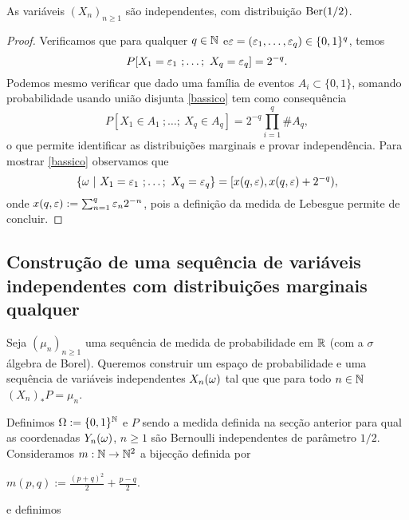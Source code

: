  \begin{proposition}

 As variáveis $(X_n)_{n\ge 1}$ são independentes, com distribuição $\operatorname{Ber}(1/2)$.

 \end{proposition}


 \begin{proof}
Verificamos que para qualquer $q\in {\ensuremath{\mathbb N}}$ e$\varepsilon=(\varepsilon_1,\dots,\varepsilon_q)\in \{0,1\}^q$,
  temos
    \begin{equation}\label{bassico}
   P[X_{1}=\varepsilon_1\ ;\dots; \ X_{q}=\varepsilon_q]=2^{-q}.
  \end{equation}
Podemos mesmo verificar que dado uma família de eventos $A_i\subset \{0,1\}$, somando probabilidade usando união disjunta \eqref{bassico} tem como consequência
   \begin{equation}
   P[X_{1}\in A_1 \ ;\dots; \ X_{q}\in A_q]=2^{-q} \prod_{i=1}^q \# A_q,
  \end{equation}
  o que permite identificar as distribuições marginais e provar independência.
Para mostrar \eqref{bassico} observamos que
  $$ \{ \go \ | \ X_{1}=\gep_1\ ;\dots; \ X_{q}=\gep_q \}= [x(q,\gep),x(q,\gep)+2^{-q}),$$
  onde $x(q,\varepsilon):=\sum_{n=1}^q \varepsilon_n 2^{-n}$, pois
a definição da medida de Lebesgue permite de concluir.


  \end{proof}





 \subsection{Construção de uma sequência de variáveis independentes com distribuições marginais qualquer}

Seja $(\mu_n)_{n\ge 1}$ uma sequência de medida de probabilidade em ${\mathbb R}$ (com a $\sigma$ álgebra de Borel).
Queremos construir um espaço de probabilidade e uma sequência de variáveis independentes $X_n(\omega)$ tal que que para todo $n\in{\ensuremath{\mathbb N}}$
$(X_n)_*P=\mu_n$.


\medskip

Definimos $\Omega:=\{0,1\}^{{\mathbb N}}$ e $P$ sendo a medida definida na secção anterior para qual
as coordenadas $Y_n(\omega)$, $n\ge 1$  são Bernoulli independentes de parâmetro $1/2$.
Consideramos $m: {\mathbb N}\to {\ensuremath{\mathbb N}}^2$ a bijecção definida por

$m(p,q):= \frac{(p+q)^2}{2}+\frac{p-q}{2}.$

e definimos

